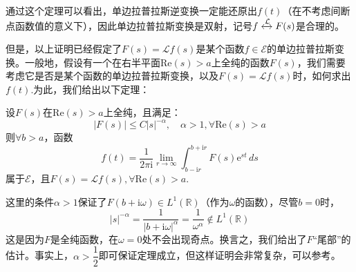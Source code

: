 通过这个定理可以看出，单边拉普拉斯逆变换一定能还原出$f(t)$（在不考虑间断点函数值的意义下），因此单边拉普拉斯变换是双射，记号$f\xleftrightarrow{ \mathcal{L} } F(s)$是合理的。

但是，以上证明已经假定了$F(s)=\mathcal{L} f(s)$是某个函数$f\in\mathcal{E} $的单边拉普拉斯变换。一般地，假设有一个在右半平面$\mathrm{Re}(s)>a$上全纯的函数$F(s)$，我们需要考虑它是否是某个函数的单边拉普拉斯变换，以及$F(s)=\mathcal{L}f(s)$时，如何求出$f(t)$.为此，我们给出以下定理\cite{distribution}：
\begin{theorem}[*单边拉普拉斯反演公式]
    \label{thm:laplace_inversion_1}
    设$F(s)$在$\mathrm{Re}(s)>a$上全纯，且满足：
    \[|F(s)|\leq C|s|^{-\alpha},\quad \alpha>1,\forall \mathrm{Re}(s)>a\]
    则$\forall b>a$，函数
    \[f(t)=\frac{1}{2\pi \mathrm{i}}\lim_{r\to\infty}\int_{b-\mathrm{i}r}^{b +\mathrm{i}r}F(s)\mathrm{e}^{st}\,ds\]
    属于$\mathcal{E} $，且$F(s)=\mathcal{L} f(s),\forall \mathrm{Re}(s)>a$.
\end{theorem}
\begin{remark}
    这里的条件$\alpha>1$保证了$F(b+\mathrm{i}\omega)\in L^1(\mathbb{R})$（作为$\omega$的函数），尽管$b=0$时，
    $$|s|^{-\alpha}=\dfrac{1}{|b+\mathrm{i}\omega|^{\alpha}}=\frac{1}{\omega^{\alpha}}\notin L^1(\mathbb{R})$$
    这是因为$F$是全纯函数，在$\omega=0$处不会出现奇点。换言之，我们给出了$F$“尾部”的估计。事实上，$\alpha>\dfrac{1}{2}$即可保证定理成立，但这样证明会非常复杂，可以参考\cite{folland}。
\end{remark}
